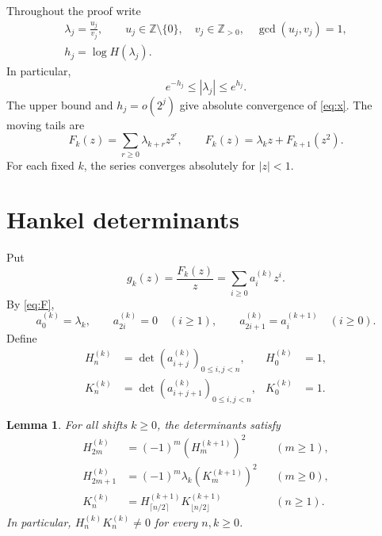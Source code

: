 \documentclass{amsart}
\newtheorem{lemma}{Lemma}[section]
\numberwithin{equation}{section}
\newcommand{\Z}{\mathbb Z}
\begin{document}
Throughout the proof write
\begin{equation}\label{eq:weights}
\begin{gathered}
\lambda_j=\frac{u_j}{v_j},\qquad
u_j\in\Z\setminus\{0\},\quad v_j\in\Z_{>0},\quad
\gcd(u_j,v_j)=1,\\
h_j=\log H(\lambda_j).
\end{gathered}
\end{equation}
In particular,
\begin{equation}\label{eq:weightbounds}
e^{-h_j}\le|\lambda_j|\le e^{h_j}.
\end{equation}
The upper bound and $h_j=o(2^j)$ give absolute convergence of
\eqref{eq:x}. The moving tails are
\begin{equation}\label{eq:F}
F_k(z)=\sum_{r\ge0}\lambda_{k+r}z^{2^r},\qquad
F_k(z)=\lambda_kz+F_{k+1}(z^2).
\end{equation}
For each fixed $k$, the series converges absolutely for $|z|<1$.

\section{Hankel determinants}

Put
\begin{equation}\label{eq:a}
g_k(z)=\frac{F_k(z)}z=\sum_{i\ge0}a_i^{(k)}z^i.
\end{equation}
By \eqref{eq:F},
\begin{equation}\label{eq:coeff}
a_0^{(k)}=\lambda_k,\qquad a_{2i}^{(k)}=0\quad(i\ge1),\qquad
a_{2i+1}^{(k)}=a_i^{(k+1)}\quad(i\ge0).
\end{equation}
Define
\begin{equation}\label{eq:HK}
\begin{aligned}
H_n^{(k)}&=\det(a_{i+j}^{(k)})_{0\le i,j<n},& H_0^{(k)}&=1,\\
K_n^{(k)}&=\det(a_{i+j+1}^{(k)})_{0\le i,j<n},& K_0^{(k)}&=1.
\end{aligned}
\end{equation}

\begin{lemma}\label{lem:hankel}
For all shifts $k\ge0$, the determinants satisfy
\begin{align}
H_{2m}^{(k)}&=(-1)^m(H_m^{(k+1)})^2 &&(m\ge1),\label{eq:Heven}\\
H_{2m+1}^{(k)}&=(-1)^m\lambda_k(K_m^{(k+1)})^2
&&(m\ge0),\label{eq:Hodd}\\
K_n^{(k)}&=H_{\lceil n/2\rceil}^{(k+1)}K_{\lfloor n/2\rfloor}^{(k+1)}
&&(n\ge1).\label{eq:Krec}
\end{align}
In particular, $H_n^{(k)}K_n^{(k)}\ne0$ for every $n,k\ge0$.
\end{lemma}
\end{document}
